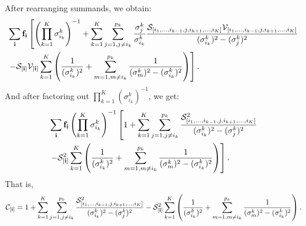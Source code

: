 After rearranging summands, we obtain:
\begin{align*}
\begin{split}
&\sum_{\bf i} \mathbf{f}_{\bf i}\left[ \left(\prod_{k=1}^K \sigma_{i_k}^k\right)^{-1} + \sum_{k=1}^K \sum_{j = 1, j\neq i_k}^{p_k} \frac{\sigma_j^k}{\sigma_{i_k}^k} \frac{\mathcal{S}_{[i_1,\ldots,i_{k-1},j,i_{k+1},\ldots,i_K]}\mathcal{V}_{[i_1,\ldots,i_{k-1},j,i_{k+1},\ldots,i_K]}}{(\sigma_{i_k}^k)^2 - (\sigma_{j}^k)^2} \right.\\
&\left. - \mathcal{S}_{\bf [i]} \mathcal{V}_{\bf [i]}\sum_{k=1}^K\left( \frac{1}{(\sigma_{i_k}^k)^2} + \sum_{m=1,m\neq i_k}^{p_k}\frac{1}{(\sigma_m^k)^2 - (\sigma_{i_k}^k)^2}  \right)\right].
\end{split}
\end{align*}
And after factoring out $\prod_{k=1}^K(\sigma_{i_k}^k)^{-1}$, we get:
\begin{align*}
\begin{split}
&\sum_{\bf i} \mathbf{f}_{\bf i}\left(\prod_{k=1}^K \sigma_{i_k}^k\right)^{-1}\left[ 1 + \sum_{k=1}^K \sum_{j = 1, j\neq i_k}^{p_k} \frac{\mathcal{S}_{[i_1,\ldots,i_{k-1},j,i_{k+1},\ldots,i_K]}^2}{(\sigma_{i_k}^k)^2 - (\sigma_{j}^k)^2} \right.\\
&\left.-\mathcal{S}_{\bf [i]}^2\sum_{k=1}^K\left( \frac{1}{(\sigma_{i_k}^k)^2} + \sum_{m=1,m\neq i_k}^{p_k}\frac{1}{(\sigma_m^k)^2 - (\sigma_{i_k}^k)^2}  \right)\right].
\end{split}
\end{align*}
That is,
\begin{align}
\label{equation:better.c}
\mathcal{C}_{[{\bf i}]} =  1 + \sum_{k=1}^K \sum_{j = 1, j\neq i_k}^{p_k} \frac{\mathcal{S}_{[i_1,\ldots,i_{k-1},j,i_{k+1},\ldots,i_K]}^2}{(\sigma_{i_k}^k)^2 - (\sigma_{j}^k)^2} - \mathcal{S}_{\bf [i]}^2\sum_{k=1}^K\left( \frac{1}{(\sigma_{i_k}^k)^2} + \sum_{m=1,m\neq i_k}^{p_k}\frac{1}{(\sigma_m^k)^2 - (\sigma_{i_k}^k)^2}  \right).
\end{align}

